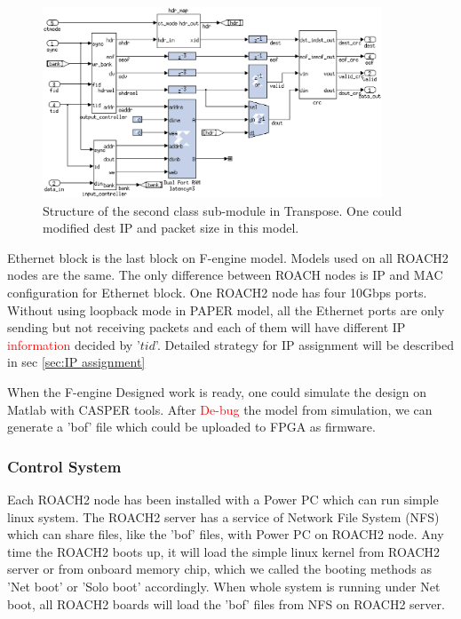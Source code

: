 \documentclass{ws-jai}
\begin{document}
\begin{figure}[t]
 \centering
 \includegraphics[width=0.9\textwidth]{./picture/transpose2.eps}
\caption{Structure of the second class sub-module in Transpose. One could modified dest IP and packet size in this model.\label{fig:transepose2}}
\end{figure}


Ethernet block is the last block on F-engine model. Models used on all ROACH2 nodes are the same. The only difference between ROACH nodes is IP and MAC configuration for Ethernet block. One ROACH2 node has four 10Gbps ports. Without using loopback mode in PAPER model, all the Ethernet ports are only sending but not receiving packets and each of them will have different IP \textcolor{red}{information} decided by '$tid$'. Detailed strategy for IP assignment will be described in sec \ref{sec:IP assignment}
	
When the F-engine Designed work is ready, one could simulate the design on Matlab with CASPER tools. After \textcolor{red}{De-bug} the model from simulation, we can generate a 'bof' file which could be uploaded to FPGA as firmware.
  
\subsubsection{Control System}

	Each ROACH2 node has been installed with a Power PC which can run simple linux system. The ROACH2 server has a service of  Network File System (NFS) which can share files, like the 'bof' files, with Power PC on ROACH2 node. Any time the ROACH2 boots up,  it will load the simple linux kernel from ROACH2 server or from onboard memory chip, which we called the booting methods as 'Net boot' or 'Solo boot' accordingly.  When whole system is running under Net boot, all ROACH2 boards will load the 'bof' files from NFS on ROACH2 server. 
	
\end{document}
